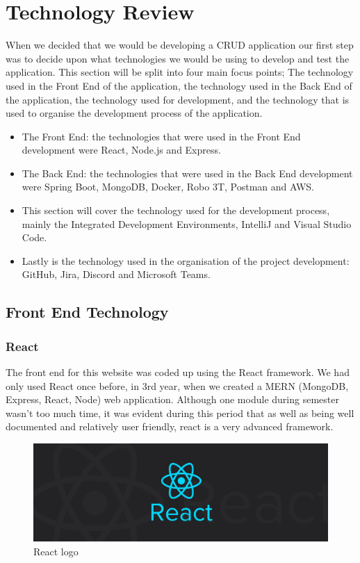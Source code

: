 \chapter{Technology Review}
 When we decided that we would be developing a CRUD application our first step was to decide upon what technologies we would be using to develop and test the application. This section will be split into four main focus points; The technology used in the Front End of the application, the technology used in the Back End of the application, the technology used for development, and the technology that is used to organise the development process of the application.
\begin{itemize}
\item The Front End: the technologies that were used in the Front End development were React, Node.js and Express.
\item The Back End: the technologies that were used in the Back End development were Spring Boot, MongoDB, Docker, Robo 3T, Postman and AWS.
\item This section will cover the technology used for the development process, mainly the Integrated Development Environments, IntelliJ and Visual Studio Code.
\item Lastly is the technology used in the organisation of the project development: GitHub, Jira, Discord and Microsoft Teams.
\end{itemize}

\section{Front End Technology}
\subsection{React}
The front end for this website was coded up using the React framework. We had only used React once before, in 3rd year, when we created a MERN (MongoDB, Express, React, Node) web application. Although one module during semester wasn't too much time, it was evident during this period that as well as being well documented and relatively user friendly, react is a very advanced framework.

\begin{figure}[th]
\renewcommand\thefigure{3.1}
\centering
\includegraphics[scale = .2]{img/reactImage.jpeg}
\caption{React logo}
\label{React}
\end{figure}

